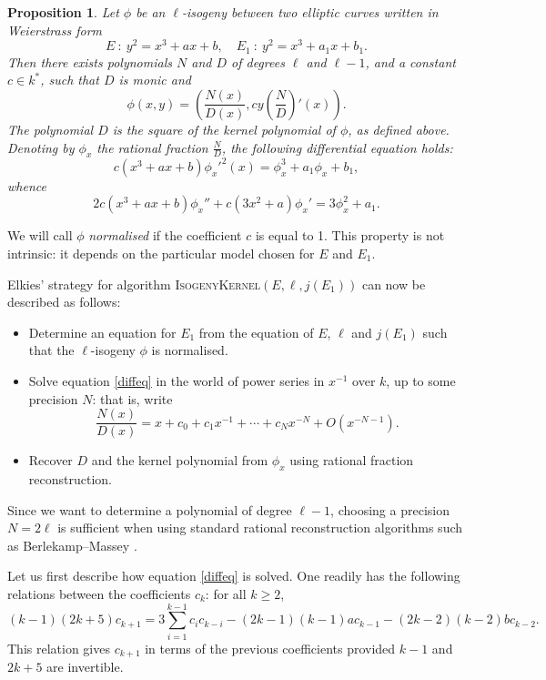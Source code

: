 \documentclass{article}
\newcommand{\algstyle}[1]{\textsc{#1}}
\newtheorem{prop}[theorem]{Proposition}
\theoremstyle{definition}
\begin{document}
\begin{prop}
Let $\phi$ be an $\ell$-isogeny between two elliptic curves written in
Weierstrass form
\[
E\ :\ y^2 = x^3 + ax + b, \quad E_1\ :\ y^2 = x^3 + a_1x + b_1.
\]
Then there exists polynomials $N$ and $D$ of degrees $\ell$ and $\ell-1$,
and a constant $c\in k^*$, such that $D$ is monic and
\[
\phi(x, y) = \left(\frac{N(x)}{D(x)}, cy\left(\frac{N}{D}\right)'(x)\right).
\]
The polynomial $D$ is the square of the kernel polynomial of $\phi$, as defined
above. Denoting by $\phi_x$ the rational fraction $\frac{N}{D}$,
the following differential equation holds:
\[
c(x^3 + ax + b)\phi_x'^2(x) = \phi_x^3 + a_1\phi_x + b_1,
\]
whence
\begin{equation}
\label{diffeq}
2c(x^3 + ax + b)\phi_x'' + c(3x^2 + a)\phi_x' =
 3\phi_x^2 + a_1.
\end{equation}
\end{prop}

We will call $\phi$ \emph{normalised} if the coefficient $c$ is equal to 1.
This property is not intrinsic: it depends on the particular model chosen
for $E$ and $E_1$.

Elkies' strategy for algorithm \algstyle{IsogenyKernel}$(E, \ell, j(E_1))$ can now be described
as follows:
\begin{itemize}
\item Determine an equation for $E_1$ from the equation of $E$, $\ell$ and
 $j(E_1)$ such that the $\ell$-isogeny $\phi$ is normalised.
\item Solve equation \ref{diffeq} in the world of power series in $x^{-1}$ over $k$, up to
 some precision $N$: that is, write
\[
\frac{N(x)}{D(x)} = x + c_0 + c_1 x^{-1} + \cdots + c_N x^{-N} + O(x^{-N-1}).
\]
\item Recover $D$ and the kernel polynomial from $\phi_x$ using rational
 fraction reconstruction.
\end{itemize}

Since we want to determine a polynomial of degree $\ell-1$, choosing a precision $N = 2\ell$
is sufficient when using standard rational reconstruction algorithms such as Berlekamp--Massey \cite{}.

Let us first describe how equation \ref{diffeq} is solved. One readily
has the following relations between the coefficients $c_k$: for all $k\geq 2$,
\begin{equation}
\label{eq:rec}
 (k-1)(2k+5)c_{k+1} = 3\sum_{i=1}^{k-1}c_i c_{k-i}
	- (2k-1)(k-1)a c_{k-1} - (2k-2)(k-2)b c_{k-2}.
\end{equation}
This relation gives $c_{k+1}$ in terms of the previous coefficients provided $k-1$
and $2k+5$ are invertible.
\end{document}
